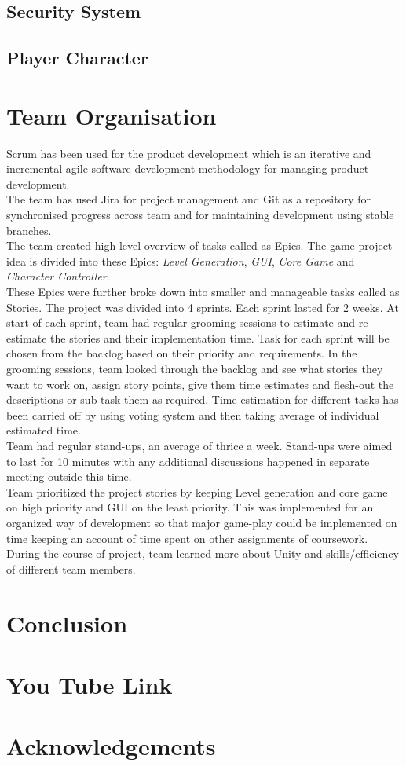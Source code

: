 \documentclass[11pt]{article}
\begin{document}
\subsection{Security System}
\subsection{Player Character}
\section{Team Organisation}
Scrum has been used for the product development which is an iterative and incremental agile software development methodology for managing product development.\\

The team has used Jira for project management and Git as a repository for synchronised progress across team and for  maintaining development using stable branches.\\

The team created high level overview of tasks called as Epics. The game project idea is divided into these Epics: \textit{Level Generation}, \textit{GUI}, \textit{Core Game} and \textit{Character Controller}.\\

These Epics were further broke down into smaller and manageable tasks called as Stories. The project was divided into 4 sprints. Each sprint lasted for 2 weeks. At start of each sprint, team had regular grooming sessions to estimate and re-estimate the stories and their implementation time. Task for each sprint will be chosen from the backlog based on their priority and requirements. In the grooming sessions, team looked through the backlog and see what stories they want to work on, assign story points, give them time estimates and flesh-out the descriptions or sub-task them as required. Time estimation for different tasks has been carried off by using voting system and then taking average of individual estimated time.\\

Team had regular stand-ups, an average of thrice a week. Stand-ups were aimed to last for 10 minutes with any additional discussions happened in separate meeting outside this time.\\

Team prioritized the project stories by keeping Level generation and core game on high priority and GUI on the least priority. This was implemented for an organized way of development so that major game-play could be implemented on time keeping an account of time spent on other assignments of coursework. During the course of project, team learned more about Unity and skills/efficiency of different team members.

\section{Conclusion}

\section{You Tube Link}

\section{Acknowledgements}
\end{document}
